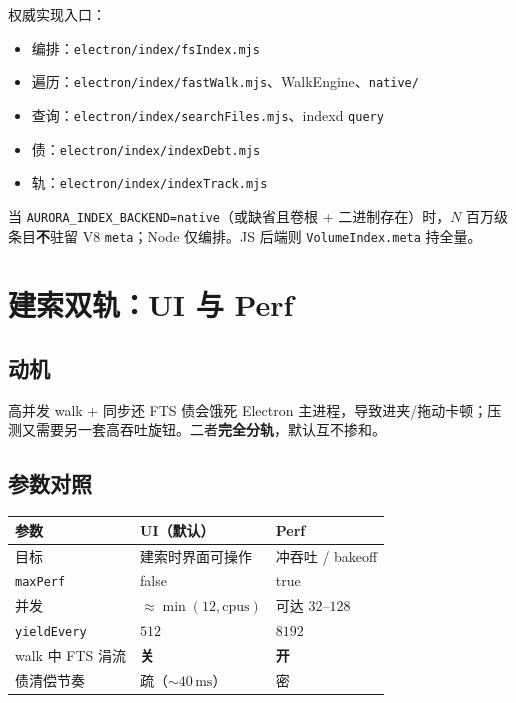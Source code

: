 \documentclass[UTF8,a4paper,11pt]{ctexart}
\begin{document}
权威实现入口：
\begin{itemize}[leftmargin=1.6em]
  \item 编排：\texttt{electron/index/fsIndex.mjs}
  \item 遍历：\texttt{electron/index/fastWalk.mjs}、WalkEngine、\texttt{native/}
  \item 查询：\texttt{electron/index/searchFiles.mjs}、indexd \texttt{query}
  \item 债：\texttt{electron/index/indexDebt.mjs}
  \item 轨：\texttt{electron/index/indexTrack.mjs}
\end{itemize}

当 \texttt{AURORA\_INDEX\_BACKEND=native}（或缺省且卷根 + 二进制存在）时，$N$ 百万级条目\textbf{不}驻留 V8 \texttt{meta}；Node 仅编排。JS 后端则 \texttt{VolumeIndex.meta} 持全量。

\section{建索双轨：UI 与 Perf}

\subsection{动机}
高并发 walk + 同步还 FTS 债会饿死 Electron 主进程，导致进夹/拖动卡顿；压测又需要另一套高吞吐旋钮。二者\textbf{完全分轨}，默认互不掺和。

\subsection{参数对照}
\begin{center}
\begin{tabular}{@{}lll@{}}
\toprule
参数 & UI（默认） & Perf \\
\midrule
目标 & 建索时界面可操作 & 冲吞吐 / bakeoff \\
\texttt{maxPerf} & false & true \\
并发 & $\approx\min(12,\mathrm{cpus})$ & 可达 $32$–$128$ \\
\texttt{yieldEvery} & $512$ & $8192$ \\
walk 中 FTS 涓流 & \textbf{关} & \textbf{开} \\
债清偿节奏 & 疏（$\sim 40\,\mathrm{ms}$） & 密 \\
\bottomrule
\end{tabular}
\end{center}
\end{document}
